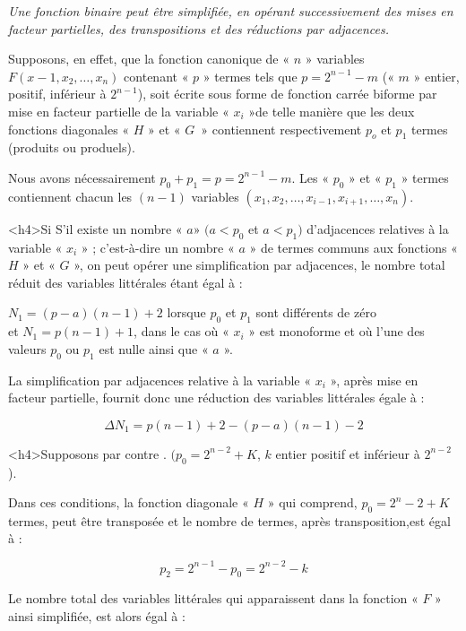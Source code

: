 \emph{Une fonction binaire peut être simplifiée, en opérant successivement des mises en facteur partielles, des transpositions et des réductions par adjacences.}

Supposons, en effet, que la fonction canonique de « $n$ » variables $F(x-1, x_2, \ldots, x_n)$ contenant « $p$ » termes tels que $p = 2^{n-1} - m$ (« $m$ » entier, positif, inférieur à $2^{n-1}$), soit écrite sous forme de fonction carrée biforme par   mise en facteur partielle de la variable « $x_i$ »de telle manière que les deux fonctions diagonales « $H$ » et « $G$~» contiennent respectivement  $p_o$ et $p_1$ termes (produits ou produels).

Nous avons nécessairement $ p_0 + p_1 = p = 2^{n-1} - m$. Les « $p_0$ » et « $p_1$ » termes contiennent chacun les $(n - 1)$ variables $(x_1, x_2, \ldots, x_{i-1}, x_{i+1}, \ldots, x_n)$.

<h4>Si 
S'il existe un nombre « $a$» $(a < p_0$ et  $a < p_1)$ d'adjacences relatives à la variable « $x_i$ » ; c'est-à-dire un nombre « $a$ » de termes communs aux fonctions « $H$ » et « $G$ », on peut opérer une simplification par adjacences, le nombre total réduit des variables littérales étant égal à :

$N_1 = (p-a) (n-1) +2$ lorsque $p_0$ et $p_1$ sont différents de zéro\\
et $N_1 = p(n-1) +1$, dans le cas où « $x_i$ » est monoforme et où l'une des valeurs $p_0$ ou $p_1$ est nulle ainsi que « $a$ ». 

La simplification par adjacences relative à la variable « $x_i$ », après mise en facteur partielle, fournit donc une réduction des variables littérales égale à :  

\[ \Delta N_1 = p (n-1) +2 - (p - a) (n-1) -2 \]

\centerline {   }


<h4>Supposons par contre {. \textmd{$(p_0 = 2^{n-2} +K$, $k$ entier positif et inférieur à $2^{n-2}$)}}. 

Dans ces conditions, la fonction diagonale « $H$ » qui comprend, $p_0 = 2^n-2 +K$ termes, peut être transposée et le nombre de termes, après transposition,est égal à : 

\[ p_2 = 2^{n-1} - p_0 = 2^{n-2} -k \]

Le nombre total des variables littérales qui apparaissent dans la fonction « $F$ » ainsi simplifiée, est alors égal à :

